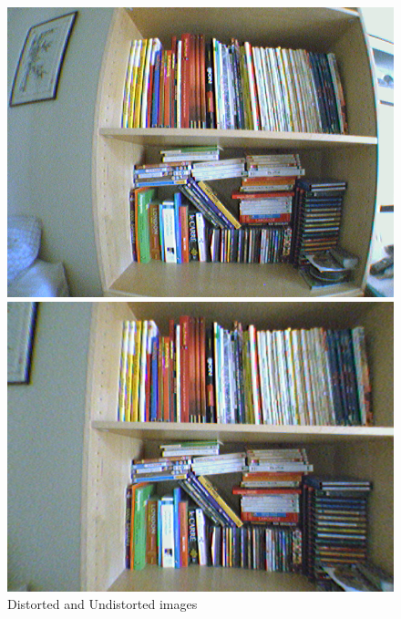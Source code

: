 \documentclass[11pt]{report}
\begin{document}
\begin{figure}[htbp]
    \centering
    \begin{minipage}[c]{.4\linewidth}
        \begin{center}
            \includegraphics[scale=.25]{images/distorted.png}
        \end{center}
    \end{minipage}
    \hfill
    \begin{minipage}[c]{.4\linewidth}
        \begin{center}
            \includegraphics[scale=.25]{images/undistorted.png}
        \end{center}
    \end{minipage}
    \caption{Distorted and Undistorted images}
    \label{fig:distorted-undistorted}
\end{figure}
\end{document}
